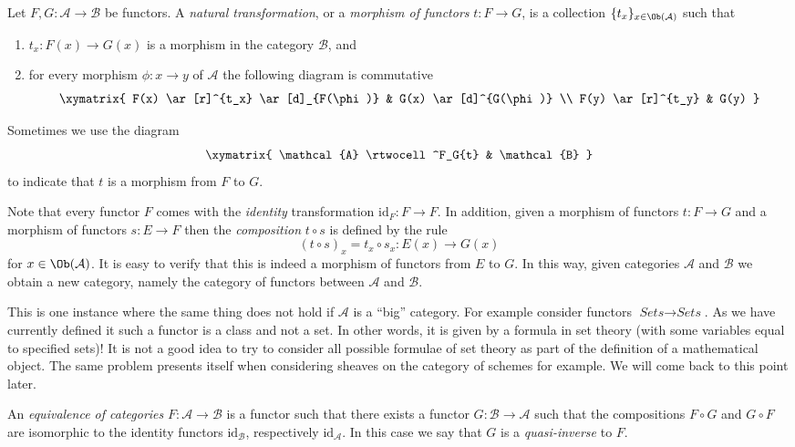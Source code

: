 \begin{definition}
\label{definition-transformation-functors}
Let $F, G : \mathcal{A} \to \mathcal{B}$ be functors.
A {\it natural transformation}, or a {\it morphism of functors}
$t : F \to G$, is a collection $\{t_x\}_{x\in \Ob(\mathcal{A})}$
such that
\begin{enumerate}
\item $t_x : F(x) \to G(x)$ is a morphism in the category $\mathcal{B}$, and
\item for every morphism $\phi : x \to y$ of $\mathcal{A}$ the following
diagram is commutative
$$
\xymatrix{
F(x) \ar[r]^{t_x} \ar[d]_{F(\phi)} & G(x) \ar[d]^{G(\phi)} \\
F(y) \ar[r]^{t_y} & G(y) }
$$
\end{enumerate}
\end{definition}

\noindent
Sometimes we use the diagram
$$
\xymatrix{
\mathcal{A}
\rtwocell^F_G{t}
&
\mathcal{B}
}
$$
to indicate that $t$ is a morphism from $F$ to $G$.

\medskip\noindent
Note that every functor $F$ comes with the {\it identity} transformation
$\text{id}_F : F \to F$. In addition, given a morphism of
functors $t : F \to G$ and a morphism of functors $s : E \to F$
then the {\it composition} $t \circ s$ is defined by the rule
$$
(t \circ s)_x = t_x \circ s_x : E(x) \to G(x)
$$
for $x \in \Ob(\mathcal{A})$.
It is easy to verify that this is indeed a morphism of functors
from $E$ to $G$.
In this way, given categories
$\mathcal{A}$ and $\mathcal{B}$ we obtain a new category,
namely the category of functors between $\mathcal{A}$ and
$\mathcal{B}$.

\begin{remark}
\label{remark-functors-sets-sets}
This is one instance where the same thing does not hold if
$\mathcal{A}$ is a ``big'' category. For example consider
functors $\textit{Sets} \to \textit{Sets}$. As we have currently
defined it such a functor is a class and not a set. In other
words, it is given by a formula in set theory (with some variables
equal to specified sets)! It is not a good idea to try to consider
all possible formulae of set theory as part of the definition of
a mathematical object. The same problem presents itself when
considering sheaves on the category of schemes for example.
We will come back to this point later.
\end{remark}

\begin{definition}
\label{definition-equivalence-categories}
An {\it equivalence of categories}
$F : \mathcal{A} \to \mathcal{B}$ is a functor such that there
exists a functor $G : \mathcal{B} \to \mathcal{A}$ such that
the compositions $F \circ G$ and $G \circ F$ are isomorphic to the
identity functors $\text{id}_\mathcal{B}$,
respectively $\text{id}_\mathcal{A}$.
In this case we say that $G$ is a {\it quasi-inverse} to $F$.
\end{definition}

